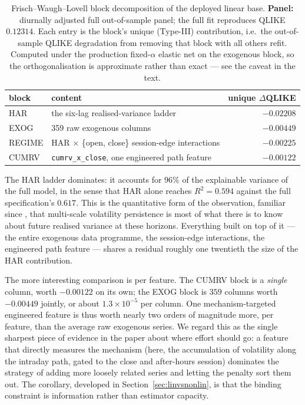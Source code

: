 \begin{table}[H]
\centering
\caption{Frisch--Waugh--Lovell block decomposition of the deployed linear base.
\textbf{Panel:} diurnally adjusted full out-of-sample panel; the full fit reproduces QLIKE
$0.12314$. Each entry is the block's unique (Type-III) contribution, i.e.\ the
out-of-sample QLIKE degradation from removing that block with all others refit. Computed
under the production fixed-$\alpha$ elastic net on the exogenous block, so the
orthogonalisation is approximate rather than exact --- see the caveat in the text.}
\label{tab:marginal_fwl}
\begin{tabular}{llr}
\toprule
block & content & unique $\Delta$QLIKE \\
\midrule
HAR    & the six-lag realised-variance ladder                     & $-0.02208$ \\
EXOG   & 359 raw exogenous columns                                & $-0.00449$ \\
REGIME & HAR $\times$ \{open, close\} session-edge interactions   & $-0.00225$ \\
CUMRV  & \texttt{cumrv\_x\_close}, one engineered path feature    & $-0.00122$ \\
\bottomrule
\end{tabular}
\end{table}

The HAR ladder dominates: it accounts for $96\%$ of the explainable variance of the full
model, in the sense that HAR alone reaches $R^2 = 0.594$ against the full specification's
$0.617$. This is the quantitative form of the observation, familiar since
\citet{Corsi2009}, that multi-scale volatility persistence is most of what there is to
know about future realised variance at these horizons. Everything built on top of it ---
the entire exogenous data programme, the session-edge interactions, the engineered path
feature --- shares a residual roughly one twentieth the size of the HAR contribution.

The more interesting comparison is per feature. The CUMRV block is a \emph{single} column,
worth $-0.00122$ on its own; the EXOG block is $359$ columns worth $-0.00449$ jointly, or
about $1.3 \times 10^{-5}$ per column. One mechanism-targeted engineered feature is thus
worth nearly two orders of magnitude more, per feature, than the average raw exogenous
series. We regard this as the single sharpest piece of evidence in the paper about where
effort should go: a feature that directly measures the mechanism (here, the accumulation of
volatility along the intraday path, gated to the close and after-hours session) dominates
the strategy of adding more loosely related series and letting the penalty sort them out.
The corollary, developed in Section~\ref{sec:linvsnonlin}, is that the binding constraint
is information rather than estimator capacity.

